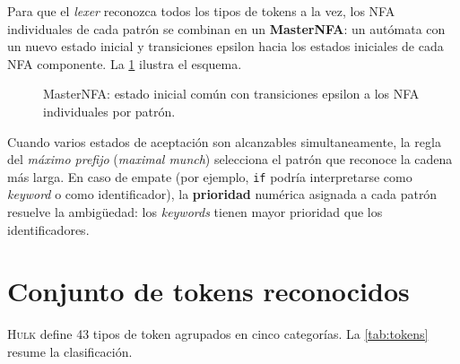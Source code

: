 \documentclass[11pt,a4paper,oneside,openany]{report}
\newcommand{\hulk}{\textsc{Hulk}}
\newcommand{\code}[1]{\texttt{#1}}
\begin{document}
Para que el \textit{lexer} reconozca todos los tipos de tokens a la vez, los NFA
individuales de cada patrón se combinan en un \textbf{MasterNFA}: un autómata con
un nuevo estado inicial y transiciones epsilon hacia los estados iniciales de cada
NFA componente. La \cref{fig:master} ilustra el esquema.

\begin{figure}[H]
\centering
{}
\caption{MasterNFA: estado inicial común con transiciones epsilon a los NFA
  individuales por patrón.}
\label{fig:master}
\end{figure}

Cuando varios estados de aceptación son alcanzables simultaneamente, la regla del
\textit{máximo prefijo} (\textit{maximal munch}) selecciona el patrón que reconoce la
cadena más larga. En caso de empate (por ejemplo, \code{if} podría interpretarse como
\textit{keyword} o como identificador), la \textbf{prioridad} numérica asignada a
cada patrón resuelve la ambigüedad: los \textit{keywords} tienen mayor prioridad que
los identificadores.

\section{Conjunto de tokens reconocidos}

\hulk{} define 43 tipos de token agrupados en cinco categorías. La
\cref{tab:tokens} resume la clasificación.
\end{document}
